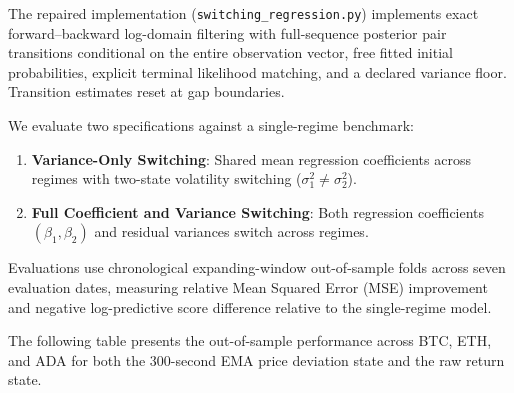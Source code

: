 The repaired implementation (\texttt{switching\_regression.py}) implements exact forward--backward log-domain filtering with full-sequence posterior pair transitions conditional on the entire observation vector, free fitted initial probabilities, explicit terminal likelihood matching, and a declared variance floor. Transition estimates reset at gap boundaries.

We evaluate two specifications against a single-regime benchmark:
\begin{enumerate}
    \item \textbf{Variance-Only Switching}: Shared mean regression coefficients across regimes with two-state volatility switching ($\sigma_1^2 \ne \sigma_2^2$).
    \item \textbf{Full Coefficient and Variance Switching}: Both regression coefficients $(\beta_1, \beta_2)$ and residual variances switch across regimes.
\end{enumerate}
Evaluations use chronological expanding-window out-of-sample folds across seven evaluation dates, measuring relative Mean Squared Error (MSE) improvement and negative log-predictive score difference relative to the single-regime model.

The following table presents the out-of-sample performance across BTC, ETH, and ADA for both the 300-second EMA price deviation state and the raw return state.

